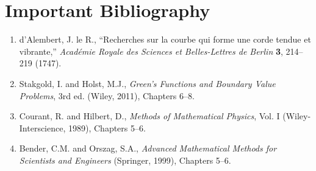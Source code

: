 \section*{Important Bibliography}

\begin{enumerate}
\item d'Alembert, J. le R., ``Recherches sur la courbe qui forme une corde tendue et vibrante,'' \textit{Acad\'emie Royale des Sciences et Belles-Lettres de Berlin} \textbf{3}, 214--219 (1747).
\item Stakgold, I. and Holst, M.J., \textit{Green's Functions and Boundary Value Problems}, 3rd ed. (Wiley, 2011), Chapters 6--8.
\item Courant, R. and Hilbert, D., \textit{Methods of Mathematical Physics}, Vol. I (Wiley-Interscience, 1989), Chapters 5--6.
\item Bender, C.M. and Orszag, S.A., \textit{Advanced Mathematical Methods for Scientists and Engineers} (Springer, 1999), Chapters 5--6.
\end{enumerate}


